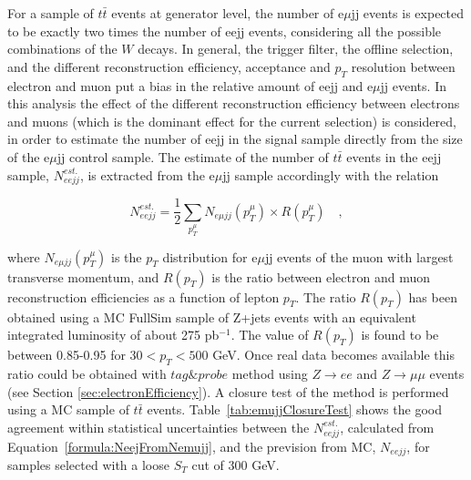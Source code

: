 For a sample of $t\bar{t}$ events at generator level, the number of e$\mu$jj events is expected to be
exactly two times the number of eejj events, considering all the possible combinations of the $W$ decays.
In general, the trigger filter, the offline selection, and the different reconstruction efficiency,
acceptance and $p_{T}$ resolution between electron and muon put a bias in the relative amount of eejj 
and e$\mu$jj events. 
In this analysis the effect of the different reconstruction efficiency between electrons and muons 
(which is the dominant effect for the current selection) 
is considered, in order to estimate the number of eejj in the signal sample directly from 
the size of the e$\mu$jj control sample. The estimate of the number of $t\bar{t}$ events in the eejj sample, 
$N_{eejj}^{est.}$, is extracted from the e$\mu$jj sample accordingly with the relation 

\begin{equation} \label{formula:NeejFromNemujj}
N_{eejj}^{est.} = \frac{1}{2}\sum_{p_{T}^{\mu}} N_{e\mu jj}(p_{T}^{\mu}) \times R(p_{T}^{\mu}) \quad , 
\end{equation}

where $N_{e\mu jj}(p_{T}^{\mu})$ is the $p_{T}$ distribution for e$\mu$jj events of the muon  
with largest transverse momentum, and $R(p_{T})$ is the ratio between electron 
and muon reconstruction efficiencies as a function of lepton $p_{T}$. The ratio $R(p_{T})$ has been obtained 
using a MC FullSim sample of Z+jets events with an equivalent integrated luminosity of about 275 pb$^{-1}$.
The value of $R(p_{T})$ is found to be between 0.85-0.95 for $30 < p_{T} < 500$ GeV.
Once real data becomes available this ratio could be obtained with $tag\&probe$ method using $Z \rightarrow ee$ and 
$Z \rightarrow \mu\mu$ events (see Section \ref{sec:electronEfficiency}).
A closure test of the method is performed using a MC sample of $t\bar{t}$ events. 
Table~\ref{tab:emujjClosureTest} shows the good agreement within statistical uncertainties between 
the $N_{eejj}^{est.}$, calculated from Equation~\ref{formula:NeejFromNemujj}, 
and the prevision from MC, $N_{eejj}$, for samples selected with a loose $S_{T}$ cut of 300 GeV.   

